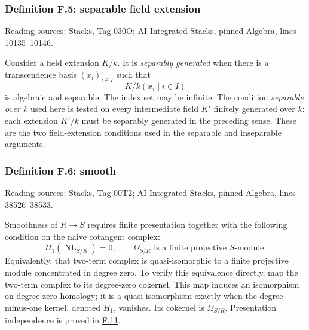 \documentclass[11pt,a4paper,openany]{report}
\begin{document}
\label{AG-RG-S05-algebra-definition-separable-field-extension}

\subsubsection{Definition F.5: separable field extension}\label{AG-RG-S05-definition-f.5-separable-field-extension}

Reading sources: \href{https://stacks.math.columbia.edu/tag/030O}{Stacks, Tag 030O}; \href{https://github.com/KokunoYumeto/unofficial-stacks-project-ai-drafts/blob/565b10e987aba5969b21145a0833f42d69f96790/algebra.tex\#L10135-L10146}{AI Integrated Stacks, pinned Algebra, lines 10135--10146}.

Consider a field extension \(K/k\). It is \emph{separably generated} when there is a transcendence basis \((x_i)_{i\in I}\) such that \[K/k(x_i\mid i\in I)\] is algebraic and separable. The index set may be infinite. The condition \emph{separable over \(k\)} used here is tested on every intermediate field \(K'\) finitely generated over \(k\): each extension \(K'/k\) must be separably generated in the preceding sense. These are the two field-extension conditions used in the separable and inseparable arguments.

\label{AG-RG-S05-algebra-definition-smooth}

\subsubsection{Definition F.6: smooth}\label{AG-RG-S05-definition-f.6-smooth}

Reading sources: \href{https://stacks.math.columbia.edu/tag/00T2}{Stacks, Tag 00T2}; \href{https://github.com/KokunoYumeto/unofficial-stacks-project-ai-drafts/blob/565b10e987aba5969b21145a0833f42d69f96790/algebra.tex\#L38526-L38533}{AI Integrated Stacks, pinned Algebra, lines 38526--38533}.

Smoothness of \(R\to S\) requires finite presentation together with the following condition on the naive cotangent complex: \[H_1(\operatorname{NL}_{S/R})=0,\qquad
\Omega_{S/R}\text{ is a finite projective }S\text{-module}.\] Equivalently, that two-term complex is quasi-isomorphic to a finite projective module concentrated in degree zero. To verify this equivalence directly, map the two-term complex to its degree-zero cokernel. This map induces an isomorphism on degree-zero homology; it is a quasi-isomorphism exactly when the degree-minus-one kernel, denoted \(H_1\), vanishes. Its cokernel is \(\Omega_{S/R}\). Presentation independence is proved in \hyperref[AG-RG-S05-algebra-lemma-NL-homotopy]{F.11}.
\end{document}
